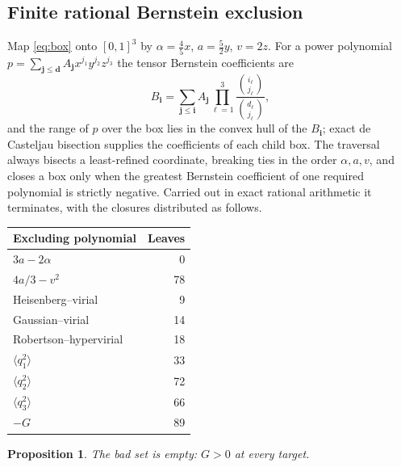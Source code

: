 \documentclass[11pt,reqno]{amsart}
\theoremstyle{plain}
\newtheorem{proposition}[theorem]{Proposition}
\theoremstyle{definition}
\theoremstyle{remark}
\numberwithin{equation}{section}
\begin{document}
\subsection{Finite rational Bernstein exclusion}

Map \eqref{eq:box} onto $[0,1]^3$ by $\alpha=\tfrac45x$, $a=\tfrac52y$,
$v=2z$. For a power polynomial
$p=\sum_{\boldsymbol j\le\boldsymbol d}A_{\boldsymbol j}
x^{j_1}y^{j_2}z^{j_3}$ the tensor Bernstein coefficients are
\begin{equation}
  \label{eq:T8}
  B_{\boldsymbol i}
  =\sum_{\boldsymbol j\le\boldsymbol i}A_{\boldsymbol j}
   \prod_{\ell=1}^3
   \frac{\binom{i_\ell}{j_\ell}}{\binom{d_\ell}{j_\ell}},
\end{equation}
and the range of $p$ over the box lies in the convex hull of the
$B_{\boldsymbol i}$; exact de Casteljau bisection supplies the coefficients
of each child box. The traversal always bisects a least-refined coordinate,
breaking ties in the order $\alpha,a,v$, and closes a box only when the
greatest Bernstein coefficient of one required polynomial is strictly
negative. Carried out in exact rational arithmetic it terminates, with the
closures distributed as follows.

\begin{center}
  \begin{tabular}{lr}
    \toprule
    Excluding polynomial & Leaves\\
    \midrule
    $3a-2\alpha$ & 0\\
    $4a/3-v^2$ & 78\\
    Heisenberg--virial & 9\\
    Gaussian--virial & 14\\
    Robertson--hypervirial & 18\\
    $\langle q_1^2\rangle$ & 33\\
    $\langle q_2^2\rangle$ & 72\\
    $\langle q_3^2\rangle$ & 66\\
    $-G$ & 89\\
    \bottomrule
  \end{tabular}
\end{center}

\begin{proposition}
  \label{prop:bernstein}
  The bad set is empty: $G>0$ at every target.
\end{proposition}
\end{document}

